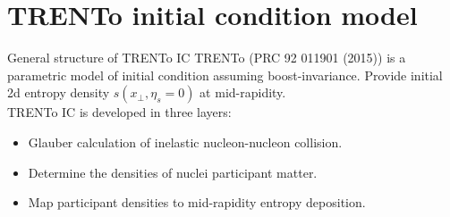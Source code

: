 \documentclass[11pt]{beamer}
\begin{document}
\section{TRENTo initial condition model}
\begin{frame}{General structure of TRENTo IC}
TRENTo (PRC 92 011901 (2015)) is a parametric model of initial condition assuming boost-invariance. Provide initial 2d entropy density $s(x_\perp, \eta_s = 0)$ at mid-rapidity.
\\
TRENTo IC is developed in three layers:
\begin{itemize}
\item Glauber calculation of inelastic nucleon-nucleon collision.
\item Determine the densities of nuclei participant matter.
\item Map participant densities to mid-rapidity entropy deposition.
\end{itemize}
\end{frame}
\end{document}
